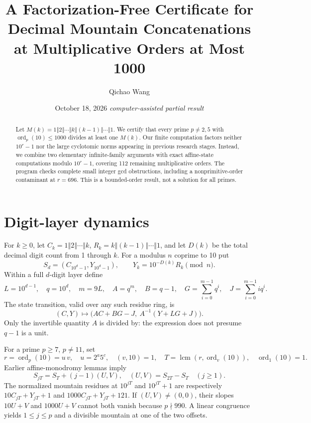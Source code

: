 \documentclass[10pt]{article}
\title{A Factorization-Free Certificate for Decimal Mountain Concatenations\\
at Multiplicative Orders at Most 1000}
\author{Qichao Wang}
\date{October 18, 2026 \quad\textit{computer-assisted partial result}}
\DeclareMathOperator{\ord}{ord}
\newcommand{\cat}{\mathbin{\Vert}}
\begin{document}
\maketitle
\begin{abstract}
Let \(M(k)=1\cat2\cat\cdots\cat k\cat(k-1)\cat\cdots\cat1\).
We certify that every prime \(p\ne2,5\) with
\(\ord_p(10)\le1000\) divides at least one \(M(k)\).
Our finite computation factors neither \(10^r-1\) nor the large
cyclotomic norms appearing in previous research stages.
Instead, we combine two elementary infinite-family arguments
with exact affine-state computations modulo \(10^r-1\),
covering 112 remaining multiplicative orders.
The program checks complete small integer gcd obstructions,
including a nonprimitive-order contaminant at \(r=696\).
This is a bounded-order result, not a solution for all primes.
\end{abstract}
\section{Digit-layer dynamics}
For \(k\ge0\), let \(C_k=1\cat2\cat\cdots\cat k\),
\(R_k=k\cat(k-1)\cat\cdots\cat1\), and let \(D(k)\) be
the total decimal digit count from 1 through \(k\).
For a modulus \(n\) coprime to 10 put
\[
 S_d=(C_{10^d-1},Y_{10^d-1}),\qquad
 Y_k=10^{-D(k)}R_k\pmod n.
\]
Within a full \(d\)-digit layer define
\[
 L=10^{d-1},\quad q=10^d,\quad m=9L,\quad
 A=q^m,\quad B=q-1,\quad
 G=\sum_{i=0}^{m-1}q^i,\quad J=\sum_{i=0}^{m-1}iq^i.
\]
The state transition, valid over any such residue ring, is
\begin{equation}
 (C,Y)\longmapsto
 \bigl(AC+BG-J,\ A^{-1}(Y+LG+J)\bigr).
 \label{eq:layer}
\end{equation}
Only the invertible quantity \(A\) is divided by:
the expression does not presume \(q-1\) is a unit.

For a prime \(p\ge7\), \(p\ne11\), set
\[
 r=\ord_p(10)=u\,v,\quad u=2^a5^c,\quad (v,10)=1,\quad
 T=\operatorname{lcm}(r,\ord_v(10)),\quad\ord_1(10)=1.
\]
Earlier affine-monodromy lemmas imply
\[
 S_{jT}=S_T+(j-1)(U,V),\quad
 (U,V)=S_{2T}-S_T\quad(j\ge1).
 \label{eq:drift}
\]
The normalized mountain residues at \(10^{jT}\) and
\(10^{jT}+1\) are respectively
\(10C_{jT}+Y_{jT}+1\) and \(1000C_{jT}+Y_{jT}+121\).
If \((U,V)\ne(0,0)\), their slopes
\(10U+V\) and \(1000U+V\) cannot both vanish
because \(p\nmid990\).
A linear congruence yields \(1\le j\le p\) and a
divisible mountain at one of the two offsets.
\end{document}
